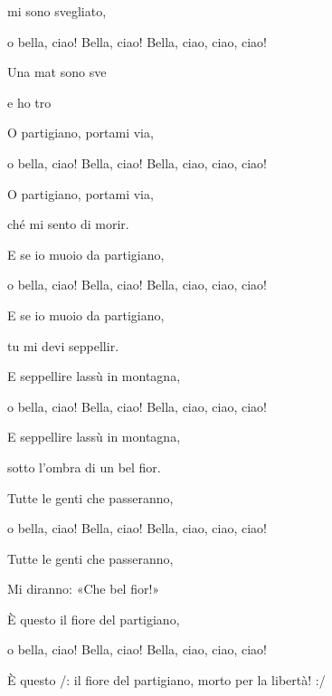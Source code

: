 

\zs
{} mi sono svegliato,

o bella, ciao! Bella, ciao! Bella, ciao, ciao, ciao!

Una mat sono sve

e ho tro
\ks

\zs
O partigiano, portami via,

o bella, ciao! Bella, ciao! Bella, ciao, ciao, ciao!

O partigiano, portami via,

ché mi sento di morir.
\ks

\zs
E se io muoio da partigiano,

o bella, ciao! Bella, ciao! Bella, ciao, ciao, ciao!

E se io muoio da partigiano,

tu mi devi seppellir.
\ks

\zs
E seppellire lassù in montagna,

o bella, ciao! Bella, ciao! Bella, ciao, ciao, ciao!

E seppellire lassù in montagna,

sotto l'ombra di un bel fior.
\ks

\zs
Tutte le genti che passeranno,

o bella, ciao! Bella, ciao! Bella, ciao, ciao, ciao!

Tutte le genti che passeranno,

Mi diranno: «Che bel fior!»
\ks

\zs
È questo il fiore del partigiano,

o bella, ciao! Bella, ciao! Bella, ciao, ciao, ciao!

È questo /: il fiore del partigiano, morto per la libertà! :/

\ks

\kp


